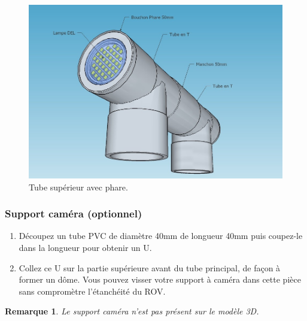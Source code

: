 \documentclass[11pt,a4paper]{article}
\newtheorem*{remarque*}{Remarque}
\begin{document}
          \begin{figure}[H]
            \centering
            \includegraphics[scale=0.24]{ROVTubeSuperieurFace.jpg}
            \caption{Tube supérieur avec phare.}
          \end{figure}
          
          
        \subsubsection{Support caméra (optionnel)}
          \begin{enumerate}
            \item Découpez un tube PVC de diamètre 40mm de longueur 40mm puis coupez-le dans la longueur pour obtenir un U.
            
            \item Collez ce U sur la partie supérieure avant du tube principal, de façon à former un dôme. Vous pouvez visser votre support à caméra dans cette pièce sans compromètre l'étanchéité du ROV.
          \end{enumerate}
          
          \begin{remarque*}
            Le support caméra n'est pas présent sur le modèle 3D.
          \end{remarque*}

          
\end{document}
